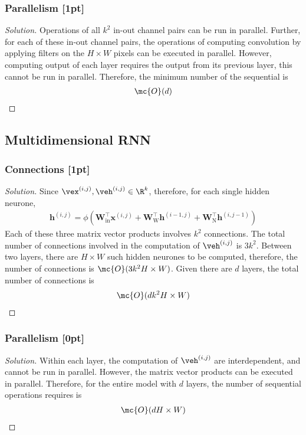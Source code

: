 \documentclass{article}
\begin{document}
	\subsubsection{Parallelism [1pt]}
	\begin{proof}[Solution]
		Operations of all $k^2$ in-out channel pairs can be run in parallel. Further, for each of these in-out channel pairs, the operations of computing convolution by applying filters on the $H \times W$ pixels can be executed in parallel. However, computing output of each layer requires the output from its previous layer, this cannot be run in parallel. Therefore, the minimum number of the sequential is 
		\begin{align}
			\mc{O}(d)
		\end{align}
	\end{proof}
	
	\subsection{Multidimensional RNN}
	\subsubsection{Connections [1pt]}
	\begin{proof}[Solution]
		Since $\vex^{(i, j)}, \veh^{(i, j)} \in \R^k$, therefore, for each single hidden neurone,
		\begin{align}
			\mathbf{h}^{(i, j)}=\phi\left(\mathbf{W}_{\mathrm{in}}^{\top} \mathbf{x}^{(i, j)}+\mathbf{W}_{\mathrm{W}}^{\top} \mathbf{h}^{(i-1, j)}+\mathbf{W}_{\mathrm{N}}^{\top} \mathbf{h}^{(i, j-1)}\right)
		\end{align}
		Each of these three matrix vector products involves $k^2$ connections. The total number of connections involved in the computation of $\veh^{(i, j)}$ is $3k^2$. Between two layers, there are $H \times W$ such hidden neurones to be computed, therefore, the number of connections is $\mc{O}(3 k^2 H \times W)$. Given there are $d$ layers, the total number of connections is 
		\begin{align}
			\mc{O}(d k^2 H \times W)
		\end{align}
	\end{proof}
	\subsubsection{Parallelism [0pt]}
	\begin{proof}[Solution]
		Within each layer, the computation of $\veh^{(i, j)}$ are interdependent, and cannot be run in parallel. However, the matrix vector products can be executed in parallel. Therefore, for the entire model with $d$ layers, the number of sequential operations requires is
		\begin{align}
			\mc{O}(d H \times W)
		\end{align}
	\end{proof}
\end{document}
